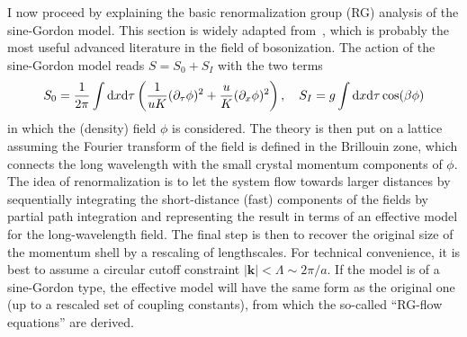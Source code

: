 I now proceed by explaining the basic renormalization group (RG) analysis of the sine-Gordon model.
This section is widely adapted from~\cite{Gogolin2004}, which is probably the most useful advanced literature in the field of bosonization.
The action of the sine-Gordon model reads $S = S_0 + S_I$ with the two terms
\begin{align}
    S_0 = \frac1{2\pi}\int\mathrm d x\mathrm d\tau\left( \frac1{uK}(\partial_\tau\phi)^2 + \frac uK (\partial_x\phi)^2 \right),
    \quad
    S_I = g\int\mathrm d x\mathrm d\tau\cos(\beta\phi)
\end{align}
in which the (density) field $\phi$ is considered.
The theory is then put on a lattice assuming the Fourier transform of the field is defined in the Brillouin zone, which connects the long wavelength with the small crystal momentum components of $\phi$.
The idea of renormalization is to let the system flow towards larger distances by sequentially integrating the short-distance (fast) components of the fields by partial path integration and representing the result in terms of an effective model for the long-wavelength field.
The final step is then to recover the original size of the momentum shell by a rescaling of lengthscales.
For technical convenience, it is best to assume a circular cutoff constraint $|{\bm k}|<\Lambda\sim2\pi/a$.
If the model is of a sine-Gordon type, the effective model will have the same form as the original one (up to a rescaled set of coupling constants), from which the so-called ``RG-flow equations'' are derived.

